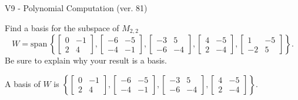 \begin{exercise}
  \begin{exerciseTitle}V9 - Polynomial Computation (ver. 81)\end{exerciseTitle}
  \begin{exerciseStatement}
    Find a basis for the subspace of \(M_{2,2}\) 
\[W=\mathrm{span}\ \left\{\left[\begin{array}{cc}
0 & -1 \\
2 & 4
\end{array}\right] , \left[\begin{array}{cc}
-6 & -5 \\
-4 & -1
\end{array}\right] , \left[\begin{array}{cc}
-3 & 5 \\
-6 & -4
\end{array}\right] , \left[\begin{array}{cc}
4 & -5 \\
2 & -4
\end{array}\right] , \left[\begin{array}{cc}
1 & -5 \\
-2 & 5
\end{array}\right]\right\}.\]
 Be sure to explain why your result is a basis.


  \end{exerciseStatement}
  \begin{exerciseAnswer}
   A basis of \(W\) is  \(\left\{\left[\begin{array}{cc}
0 & -1 \\
2 & 4
\end{array}\right] , \left[\begin{array}{cc}
-6 & -5 \\
-4 & -1
\end{array}\right] , \left[\begin{array}{cc}
-3 & 5 \\
-6 & -4
\end{array}\right] , \left[\begin{array}{cc}
4 & -5 \\
2 & -4
\end{array}\right]\right\}\).
  


  \end{exerciseAnswer}
\end{exercise}